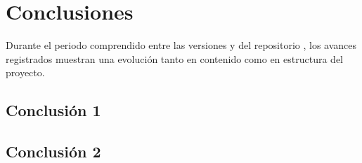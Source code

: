 
\section{Conclusiones}
\label{sec:conclusiones}


Durante el periodo comprendido entre las versiones \texttt{\VerRef}
y \texttt{\VerActual} del repositorio \texttt{\NombreRepo}, los avances
registrados muestran una evolución tanto en contenido como en estructura
del proyecto.

\subsection{Conclusión 1}
\label{ssec:conclusion-1}

\lipsum[2]  %

\subsection{Conclusión 2}
\label{ssec:conclusion-2}

\lipsum[3]  %
